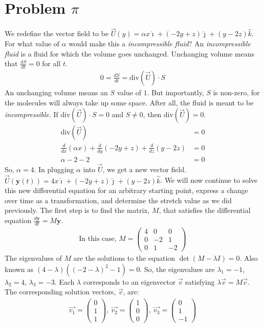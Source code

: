 \documentclass[a4paper]{article}
\newcommand{\sderof}[2]{\frac{d}{d#1}(#2)}
\newcommand{\der}[2]{\frac{d#1}{d#2}}
\begin{document}
\section{Problem $\pi$}
We redefine the vector field to be $\vec{U}(y)=\alpha x\hat{\imath}+(-2y+z)\hat{\jmath}+(y-2z)\hat{k}$. For what value of $\alpha$ would make this a \textit{incompressible fluid}? An \textit{incompressible fluid} is a fluid for which the volume goes unchanged.
Unchanging volume means that $\der{S}{t}=0$ for all $t$.
\begin{align*}
	0 = \der{S}{t} = \text{div}(\vec{U})\cdot S
\end{align*}
An unchanging volume means an $S$ value of $1$. But importantly, $S$ is non-zero, for the molecules will always take up some space. After all, the fluid is meant to be \textit{incompressible}.
If $\text{div}(\vec{U})\cdot S = 0$ and $S\ne 0$, then $\text{div}(\vec{U}) = 0$.
\begin{align*}
\text{div}(\vec{U}) &= 0 \\
\sderof{x}{\alpha x} + \sderof{y}{-2y+z} + \sderof{z}{y-2z} &= 0 \\
\alpha -2 -2 &= 0
\end{align*}
So, $\alpha = 4$. In plugging $\alpha$ into $\vec{U}$, we get a new vector field. $\vec{U}(\mathbf{y}(t)) = 4x\hat{\imath} + (-2y+z)\hat{\jmath} + (y-2z)\hat{k}$. We will now continue to solve this new differential equation for an arbitrary starting point, express a change over time as a transformation, and determine the stretch value as we did previously. The first step is to find the matrix, $M$, that satisfies the differential equation $\der{\mathbf{y}}{t}=M\mathbf{y}$.
\begin{align*}
\text{In this case, } M = 
\begin{pmatrix}
4 & 0 & 0 \\
0 & -2 & 1 \\
0 & 1 & -2
\end{pmatrix}
\end{align*}
The eigenvalues of $M$ are the solutions to the equation $\det(M-\lambda I)=0$. Also known as $(4-\lambda)((-2-\lambda)^2-1)=0$. So, the eigenvalues are $\lambda_1=-1$, $\lambda_2=4$, $\lambda_3=-3$. Each $\lambda$ corresponds to an eigenvector $\vec{v}$ satisfying $\lambda\vec{v}=M\vec{v}$. The corresponding solution vectors, $\vec{v}$, are:
\begin{align*}
	\vec{v_1} = \begin{pmatrix} 0 \\ 1 \\ 1 \end{pmatrix},\ 
	\vec{v_2} = \begin{pmatrix} 1 \\ 0 \\ 0 \end{pmatrix},\ 
	\vec{v_3} = \begin{pmatrix} 0 \\ 1 \\ -1 \end{pmatrix}
\end{align*}
\end{document}
